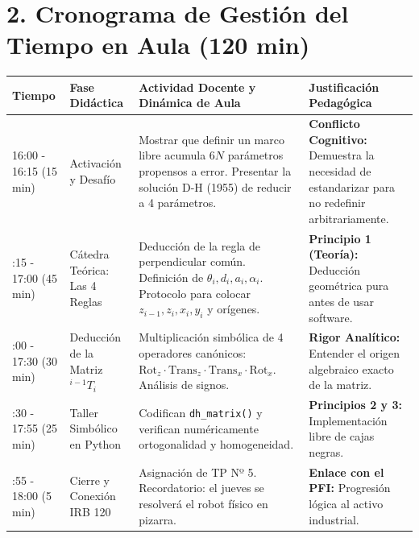 \documentclass[11pt, a4paper]{article}
\begin{document}
\section*{2. Cronograma de Gestión del Tiempo en Aula (120 min)}
\noindent
\begin{tabularx}{\textwidth}{@{} l >{\raggedright\arraybackslash}p{3cm} X X @{}}
\toprule
\textbf{Tiempo} & \textbf{Fase Didáctica} & \textbf{Actividad Docente y Dinámica de Aula} & \textbf{Justificación Pedagógica} \\ \midrule
16:00 - 16:15 \newline (15 min) & Activación y Desafío & Mostrar que definir un marco libre acumula $6N$ parámetros propensos a error. Presentar la solución D-H (1955) de reducir a 4 parámetros. & \textbf{Conflicto Cognitivo:} Demuestra la necesidad de estandarizar para no redefinir arbitrariamente. \\ \addlinespace
16:15 - 17:00 \newline (45 min) & Cátedra Teórica: Las 4 Reglas & Deducción de la regla de perpendicular común. Definición de $\theta_i, d_i, a_i, \alpha_i$. Protocolo para colocar $z_{i-1}, z_i, x_i, y_i$ y orígenes. & \textbf{Principio 1 (Teoría):} Deducción geométrica pura antes de usar software. \\ \addlinespace
17:00 - 17:30 \newline (30 min) & Deducción de la Matriz $^{i-1}T_i$ & Multiplicación simbólica de 4 operadores canónicos: $\text{Rot}_z \cdot \text{Trans}_z \cdot \text{Trans}_x \cdot \text{Rot}_x$. Análisis de signos. & \textbf{Rigor Analítico:} Entender el origen algebraico exacto de la matriz. \\ \addlinespace
17:30 - 17:55 \newline (25 min) & Taller Simbólico en Python & Codifican \texttt{dh\_matrix()} y verifican numéricamente ortogonalidad y homogeneidad. & \textbf{Principios 2 y 3:} Implementación libre de cajas negras. \\ \addlinespace
17:55 - 18:00 \newline (5 min) & Cierre y Conexión IRB 120 & Asignación de TP Nº 5. Recordatorio: el jueves se resolverá el robot físico en pizarra. & \textbf{Enlace con el PFI:} Progresión lógica al activo industrial. \\ \bottomrule
\end{tabularx}
\end{document}
